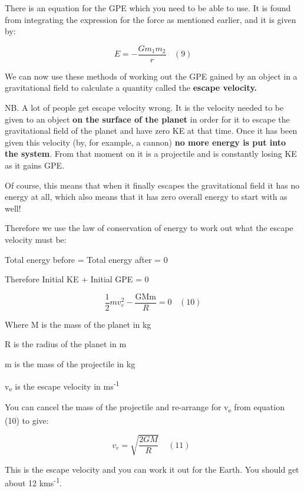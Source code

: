\documentclass[revision-guide.tex]{subfiles}
\begin{document}

There is an equation for the GPE which you need to be able to use. It is
found from integrating the expression for the force as mentioned
earlier, and it is given by:

\[E = - \frac{Gm_{1}m_{2}}{r}\ \ \ \ (9)\]


We can now use these methods of working out the GPE gained by an object
in a gravitational field to calculate a quantity called the
\textbf{escape velocity.}

NB. A lot of people get escape velocity wrong. It is the velocity needed
to be given to an object \textbf{on the surface of the planet} in order
for it to escape the gravitational field of the planet and have zero KE
at that time. Once it has been given this velocity (by, for example, a
cannon) \textbf{no more energy is put into the system}. From that moment
on it is a projectile and is constantly losing KE as it gains GPE.

Of course, this means that when it finally escapes the gravitational
field it has no energy at all, which also means that it has zero overall
energy to start with as well!

Therefore we use the law of conservation of energy to work out what the
escape velocity must be:

Total energy before = Total energy after = 0

Therefore Initial KE + Initial GPE = 0

\[\frac{1}{2}mv_{e}^{2} - \frac{\text{GMm}}{R} = 0\ \ \ \ \left( 10 \right)\]

Where M is the mass of the planet in kg

R is the radius of the planet in m

m is the mass of the projectile in kg

v\textsubscript{e} is the escape velocity in ms\textsuperscript{-1}

You can cancel the mass of the projectile and re-arrange for
v\textsubscript{e} from equation (10) to give:

\[v_{e} = \sqrt{\frac{2GM}{R}}\ \ \ \ \ (11)\ \ \]

This is the escape velocity and you can work it out for the Earth. You
should get about 12 kms\textsuperscript{-1}.
\end{document}
